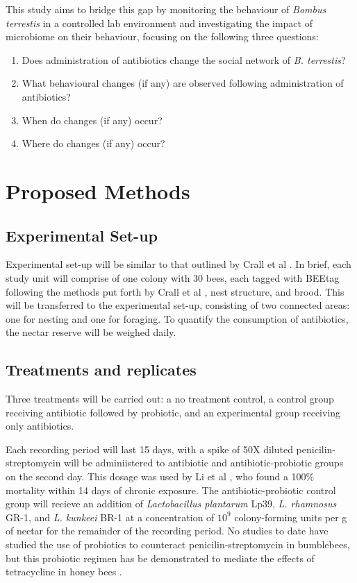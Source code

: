 \documentclass[10pt]{article}
\begin{document}
       This study aims to bridge this gap by monitoring the behaviour of \textit{Bombus terrestis} in a controlled lab environment and investigating the impact of microbiome on their behaviour,
       focusing on the following three questions:
       \begin{enumerate}
            \item Does administration of antibiotics change the social network of \textit{B. terrestis}?
            \item What behavioural changes (if any) are observed following administration of antibiotics?
            \item When do changes (if any) occur?
            \item Where do changes (if any) occur?
       \end{enumerate}
 
    \section{Proposed Methods}
        \subsection{Experimental Set-up}
            Experimental set-up will be similar to that outlined by Crall et al
            \cite{crall2018neonicotinoid}.
            In brief, each study unit will comprise of one colony with 30 bees, each tagged with BEEtag following the methods put forth by Crall et al
            \cite{crall2015beetag}, nest structure, and brood.
            This will be transferred to the experimental set-up,
            consisting of two connected areas: one for nesting and one for foraging.
            To quantify the consumption of antibiotics,
            the nectar reserve will be weighed daily.
 
        \subsection{Treatments and replicates}
            Three treatments will be carried out: a no treatment control,
            a control group receiving antibiotic followed by probiotic,
            and an experimental group receiving only antibiotics.

            Each recording period will last 15 days,
            with a spike of 50X diluted penicilin-streptomycin will be adminiistered to antibiotic and antibiotic-probiotic groups on the second day.
            This dosage was used by Li et al
            \cite{li2017new},
            who found a 100\% mortality within 14 days of chronic exposure.
            The antibiotic-probiotic control group will recieve an addition of \textit{Lactobacillus plantarum} Lp39, \textit{L. rhamnosus} GR-1, and \textit{L. kunkeei} BR-1 at a concentration of \(10^9\)
            colony-forming units per g of nectar for the remainder of the recording period.
            No studies to date have studied the use of probiotics to counteract penicilin-streptomycin in bumblebees,
            but this probiotic regimen has be demonstrated to mediate the effects of tetracycline in honey bees
            \cite{daisley2020lactobacillus}.
\end{document}
